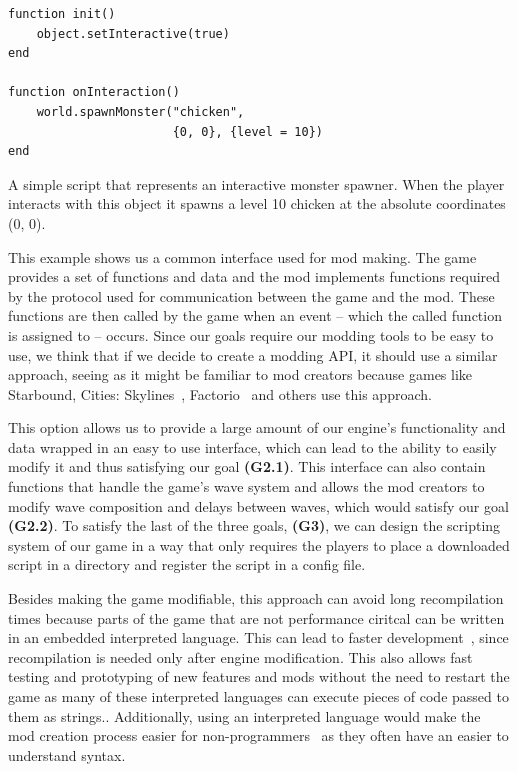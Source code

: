 \begin{listing}[h]
    \centering
    \begin{lstlisting}
function init()
    object.setInteractive(true)
end

function onInteraction()
    world.spawnMonster("chicken",
                       {0, 0}, {level = 10})
end
    \end{lstlisting}
    \caption{A simple script that represents an interactive monster spawner. When the player interacts
            with this object it spawns a level 10 chicken at the absolute coordinates (0, 0).}
    \label{sb-lua-mod-ex}
\end{listing}

This example shows us a common interface used for mod making. The game provides a set of functions and data and the mod implements
functions required by the protocol used for communication between the game and the mod. These functions are then called by the game
when an event -- which the called function is assigned to -- occurs. Since our goals require our modding tools to be easy to use,
we think that if we decide to create a modding API, it should use a similar approach, seeing as it might be familiar to mod
creators because games like Starbound, Cities: Skylines~\cite{Skylines}, Factorio~\cite{Factorio} and others use this approach.

This option allows us to provide a large amount of our engine's functionality and data wrapped in an easy to use interface, which can lead
to the ability to easily modify it and thus satisfying our goal \textbf{(G2.1)}. This interface can also contain functions that handle the
game's wave system and allows the mod creators to modify wave composition and delays between waves, which would satisfy our goal
\textbf{(G2.2)}. To satisfy the last of the three goals, \textbf{(G3)}, we can design the scripting system of our game in a way that only
requires the players to place a downloaded script in a directory and register the script in a config file.

Besides making the game modifiable, this approach can avoid long recompilation times because parts of the game that are not performance
ciritcal can be written in an embedded interpreted language. This can lead to faster development~\cite{GEA}, since recompilation is
needed only after engine modification. This also allows fast testing and prototyping of new features and mods without the need
to restart the game as many of these interpreted languages can execute pieces of code passed to them as strings..
Additionally, using an interpreted language would make the mod creation process easier for non-programmers~\cite{WhyScripting} as
they often have an easier to understand syntax.

